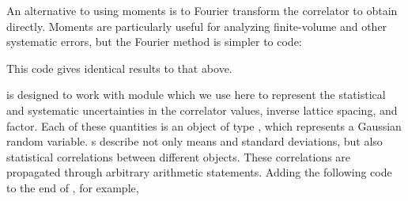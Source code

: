 \documentclass[letterpaper,10pt,english]{sphinxmanual}
\begin{document}
An alternative to using moments is to Fourier transform the
correlator to obtain  directly. Moments are particularly
useful for analyzing finite-volume and other systematic errors, but
the Fourier method is simpler to code:

%
\begin{sphinxVerbatim}[commandchars=\\\{\}]
     
   
 

      
\end{sphinxVerbatim}

This code gives identical results to that above.

{\hyperref[\detokenize{g2tools:module-g2tools}]{}} is designed to work with module  which we use here
to represent the statistical and systematic uncertainties in
the correlator values, inverse lattice spacing, and  factor. Each of these
quantities is an object of type , which represents
a Gaussian random variable. s describe not only
means and standard deviations, but also statistical correlations between
different objects. These correlations are propagated through arbitrary
arithmetic statements. Adding the following code to the end of ,
for example,
\end{document}
